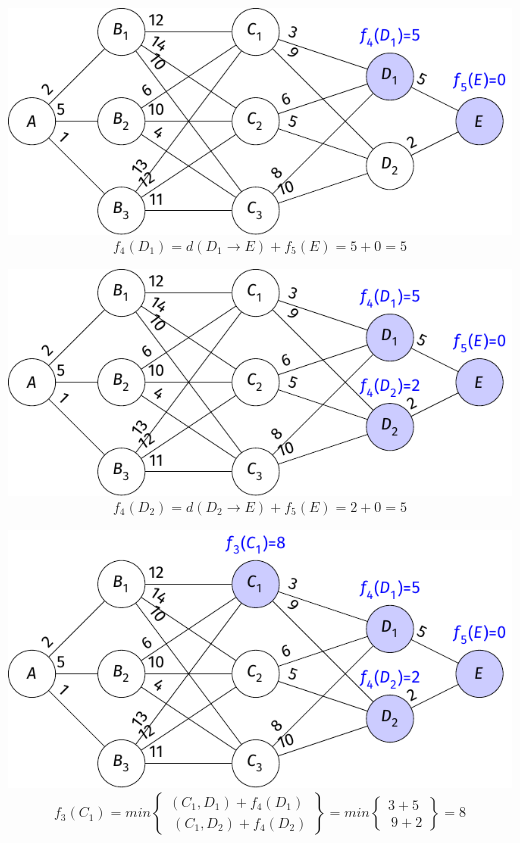 \begin{frame}
    \includegraphics{fig/4-2-2.pdf}
    $$f_4(D_1)=d(D_1\rightarrow E)+f_5(E)=5+0=5$$
\end{frame}
\begin{frame}
    \includegraphics{fig/4-2-3.pdf}
    $$f_4(D_2)=d(D_2\rightarrow E)+f_5(E)=2+0=5$$
\end{frame}
\begin{frame}
    \includegraphics{fig/4-2-4.pdf}
    $$f_3(C_1)=min \begin{Bmatrix}(C_1,D_1)+f_4(D_1)\\\ (C_1,D_2)+f_4(D_2) \end{Bmatrix} =min \begin{Bmatrix}3+5\\\ 9+2 \end{Bmatrix} =8$$
\end{frame}
